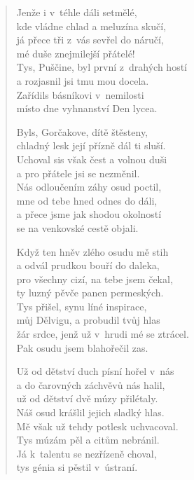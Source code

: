 \begin{verse}
\medskip

Jenže i v~téhle dáli setmělé,\\
kde vládne chlad a meluzína skučí,\\
já přece tři z~vás sevřel do náručí,\\
mé duše znejmilejší přátelé!\\
Tys, Puščine, byl první z~drahých hostí\\
a rozjasnil jsi tmu mou docela.\\
Zařídils básníkovi v~nemilosti\\
místo dne vyhnanství Den lycea.

\medskip

Byls, Gorčakove, dítě štěsteny,\\
chladný lesk její přízně dál ti sluší.\\
Uchoval sis však čest a volnou duši\\
a pro přátele jsi se nezměnil.\\
Nás odloučením záhy osud poctil,\\
mne od tebe hned odnes do dáli,\\
a přece jsme jak shodou okolností\\
se na venkovské cestě objali.

\medskip

Když ten hněv zlého osudu mě stih\\
a odvál prudkou bouří do daleka,\\
pro všechny cizí, na  tebe jsem čekal,\\
ty luzný pěvče panen permeských.\\
Tys přišel, synu líné inspirace,\\
můj Dělvigu, a probudil tvůj hlas\\
žár srdce, jenž už v~hrudi mé se ztrácel.\\
Pak osudu jsem blahořečil zas.

\medskip

Už od dětství duch písní hořel v~nás\\
a do čarovných záchvěvů nás halil,\\
už od dětství dvě múzy přilétaly.\\
Náš osud krášlil jejich sladký hlas.\\
Mě však už tehdy potlesk uchvacoval.\\
Tys múzám pěl a citům nebránil.\\
Já k~talentu se nezřízeně choval,\\
tys génia si pěstil v~ústraní.


\end{verse}
